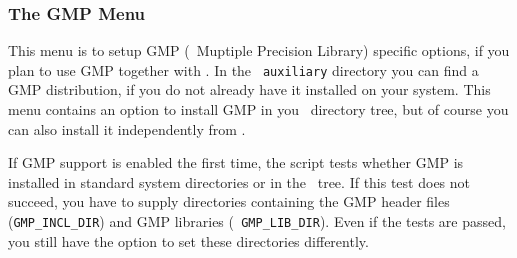 
\subsubsection{The GMP Menu}\label{sec:gmp-menu}

This menu is to setup GMP (\gnu\ Muptiple Precision Library) specific
options, if you plan to use GMP together with \cgal . In the {\tt
  auxiliary} directory you can find a GMP distribution, if you do not
already have it installed on your system. This menu contains an option
to install GMP in you \cgal\ directory tree, but of course you can
also install it independently from \cgal .

If GMP support is enabled the first time, the script tests whether GMP
is installed in standard system directories or in the \cgal\ tree. If
this test does not succeed, you have to supply directories containing
the GMP header files ({\tt GMP\_INCL\_DIR}) and GMP libraries ({\tt
  GMP\_LIB\_DIR}).  Even if the tests are passed, you still have the
option to set these directories differently.\bigskip

